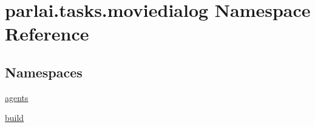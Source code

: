 \hypertarget{namespaceparlai_1_1tasks_1_1moviedialog}{}\section{parlai.\+tasks.\+moviedialog Namespace Reference}
\label{namespaceparlai_1_1tasks_1_1moviedialog}
\subsection*{Namespaces}
\begin{DoxyCompactItemize}
\item 
 \hyperlink{namespaceparlai_1_1tasks_1_1moviedialog_1_1agents}{agents}
\item 
 \hyperlink{namespaceparlai_1_1tasks_1_1moviedialog_1_1build}{build}
\end{DoxyCompactItemize}
